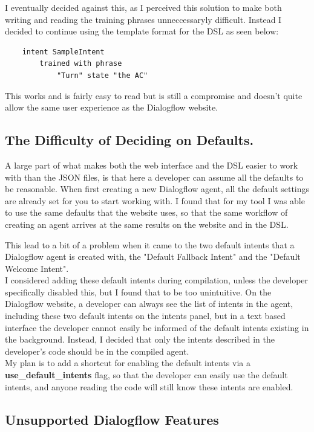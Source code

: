 I eventually decided against this, as I perceived this solution to make both writing and reading the training phrases unneccessaryly difficult. Instead I decided to continue using the template format for the DSL as seen below:

\begin{lstlisting}
    intent SampleIntent
        trained with phrase
            "Turn" state "the AC"
\end{lstlisting}

This works and is fairly easy to read but is still a compromise and doesn't quite allow the same user experience as the Dialogflow website.

\subsection{The Difficulty of Deciding on Defaults.}

A large part of what makes both the web interface and the DSL easier to work with than the JSON files, is that here a developer can assume all the defaults to be reasonable. When first creating a new Dialogflow agent, all the default settings are already set for you to start working with. I found that for my tool I was able to use the same defaults that the website uses, so that the same workflow of creating an agent arrives at the same results on the website and in the DSL.

This lead to a bit of a problem when it came to the two default intents that a Dialogflow agent is created with, the "Default Fallback Intent" and the "Default Welcome Intent". \\
I considered adding these default intents during compilation, unless the developer specifically disabled this, but I found that to be too unintuitive. On the Dialogflow website, a developer can always see the list of intents in the agent, including these two default intents on the intents panel, but in a text based interface the developer cannot easily be informed of the default intents existing in the background. Instead, I decided that only the intents described in the developer's code should be in the compiled agent. \\
My plan is to add a shortcut for enabling the default intents via a \textbf{use\_default\_intents} flag, so that the developer can easily use the default intents, and anyone reading the code will still know these intents are enabled.

\subsection{Unsupported Dialogflow Features}

